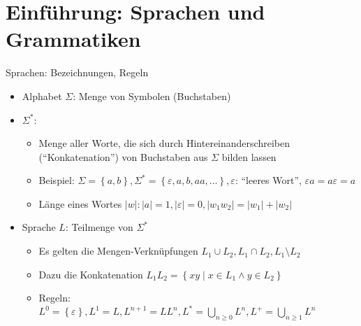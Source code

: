 \section{Einführung: Sprachen und Grammatiken}

\begin{frame}{Sprachen: Bezeichnungen, Regeln}
	\begin{itemize}
		\item Alphabet $\Sigma$: Menge von Symbolen (Buchstaben)
		\item $\Sigma^*$:
		\begin{itemize}
			\item Menge aller Worte, die sich durch Hintereinanderschreiben ("`Konkatenation"') von Buchstaben aus $\Sigma$ bilden lassen
			\item Beispiel: $\Sigma=\left\{a,b\right\}, \Sigma^*=\left\{\varepsilon, a, b, aa, \ldots\right\}, \varepsilon$: "`leeres Wort"', $\varepsilon a=a \varepsilon = a$
			\item Länge eines Wortes $|w|: |a|=1, |\varepsilon|=0, |w_1w_2|=|w_1|+|w_2|$
		\end{itemize}
		\item Sprache $L$: Teilmenge von $\Sigma^*$
		\begin{itemize}
			\item Es gelten die Mengen-Verknüpfungen $L_1 \cup L_2, L_1 \cap L_2, L_1 \setminus L_2$
			\item Dazu die Konkatenation $L_1L_2=\left\{xy \mid x \in L_1 \land y \in L_2\right\}$
			\item Regeln:\\
			$L^0=\left\{\varepsilon\right\}, L^1=L, L^{n+1}=LL^n, L^*=\bigcup_{n\geq0}L^n, L^+=\bigcup_{n\geq1}L^n$
		\end{itemize}
	\end{itemize}
\end{frame}

